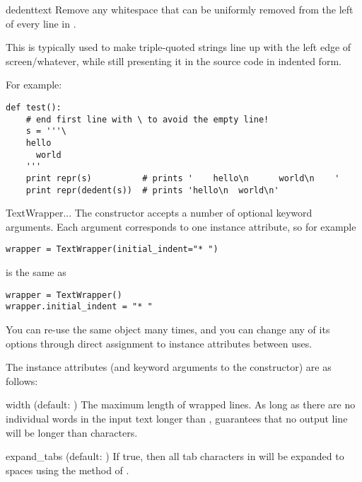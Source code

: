\begin{funcdesc}{dedent}{text} 
Remove any whitespace that can be uniformly removed from the left
of every line in .

This is typically used to make triple-quoted strings line up with
the left edge of screen/whatever, while still presenting it in the
source code in indented form. 

For example:
\begin{verbatim}
def test():
    # end first line with \ to avoid the empty line!
    s = '''\
    hello
      world
    '''
    print repr(s)          # prints '    hello\n      world\n    '
    print repr(dedent(s))  # prints 'hello\n  world\n'
\end{verbatim}
\end{funcdesc}

\begin{classdesc}{TextWrapper}{...}
The  constructor accepts a number of optional
keyword arguments.  Each argument corresponds to one instance attribute,
so for example
\begin{verbatim}
wrapper = TextWrapper(initial_indent="* ")
\end{verbatim}
is the same as
\begin{verbatim}
wrapper = TextWrapper()
wrapper.initial_indent = "* "
\end{verbatim}

You can re-use the same  object many times, and you
can change any of its options through direct assignment to instance
attributes between uses.
\end{classdesc}

The  instance attributes (and keyword arguments to
the constructor) are as follows:

\begin{memberdesc}{width}
(default: ) The maximum length of wrapped lines.  As long as
there are no individual words in the input text longer than
,  guarantees that no output line
will be longer than \member{width} characters.
\end{memberdesc}

\begin{memberdesc}{expand_tabs}
(default: ) If true, then all tab characters in 
will be expanded to spaces using the \method{expandtabs()} method of
\var{text}.
\end{memberdesc}

